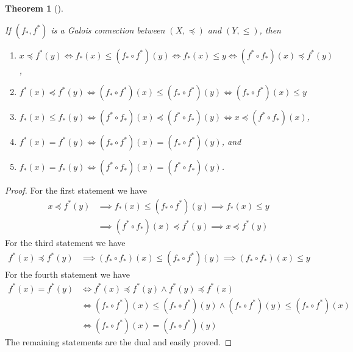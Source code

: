 \documentclass[
  letterpaper,
  10pt,
  reqno,
  twopage,
  openany]{book}
\providecommand{\tightlist}{%
  \setlength{\itemsep}{0pt}\setlength{\parskip}{0pt}}\usepackage{longtable,booktabs,array}
\theoremstyle{plain}
\theoremstyle{definition}
\theoremstyle{definition}
\theoremstyle{definition}
\theoremstyle{plain}
\theoremstyle{plain}
\newtheorem{theorem}{Theorem}[chapter]
\theoremstyle{remark}
\begin{document}
\leavevmode{}%
\begin{theorem}[]\label{thm-calcprop1}

If \((f_*, f^*)\) is a Galois connection between \((X,\preceq)\) and
\((Y,\leqslant)\), then

\begin{enumerate}
\def\labelenumi{\arabic{enumi}.}
\tightlist
\item
  \(x \preceq f^*(y) \Longleftrightarrow f_*(x)\leqslant (f_*\circ f^*)(y) \Longleftrightarrow f_*(x)\leqslant y \Longleftrightarrow (f^*\circ f_*)(x)\preceq f^*(y)\),
\item
  \(f^*(x)\preceq f^*(y) \Longleftrightarrow (f_*\circ f^*)(x)\leqslant (f_*\circ f^*)(y) \Longleftrightarrow (f_*\circ f^*)(x)\leqslant y\)
\item
  \(f_*(x)\leqslant f_*(y) \Longleftrightarrow (f^*\circ f_*)(x)\preceq (f^*\circ f_*)(y) \Longleftrightarrow x\preceq (f^*\circ f_*)(x)\),
\item
  \(f^*(x)=f^*(y) \Longleftrightarrow (f_*\circ f^*)(x)=(f_*\circ f^*)(y)\),
  and
\item
  \(f_*(x)=f_*(y) \Longleftrightarrow (f^*\circ f_*)(x)=(f^*\circ f_*)(y)\).
\end{enumerate}

\end{theorem}

\begin{proof}

For the first statement we have \begin{align*}
x \preceq f^*(y) & \implies f_*(x)\leqslant (f_*\circ f^*)(y) \implies f_*(x)\leqslant y \\
& \implies (f^*\circ f_*)(x) \preceq f^*(y)  \implies x\preceq f^*(y)  
\end{align*} For the third statement we have \begin{align*}
f^*(x) \preceq f^*(y) & \implies (f_*\circ f_*)(x)\leqslant (f_*\circ f^*)(y) \implies (f_*\circ f_*)(x)\leqslant y 
\end{align*} For the fourth statement we have \begin{align*}
f^*(x)=f^*(y) &  \Longleftrightarrow f^*(x)\preceq f^*(y) \land f^*(y) \preceq f^*(x) \\
& \Longleftrightarrow (f_*\circ f^*)(x)\leqslant (f_*\circ f^*)(y) \land  (f_*\circ f^*)(y)\leqslant (f_*\circ f^*)(x) \\
& \Longleftrightarrow (f_*\circ f^*)(x)=(f_*\circ f^*)(y) 
\end{align*} The remaining statements are the dual and easily proved.

\end{proof}
\end{document}
